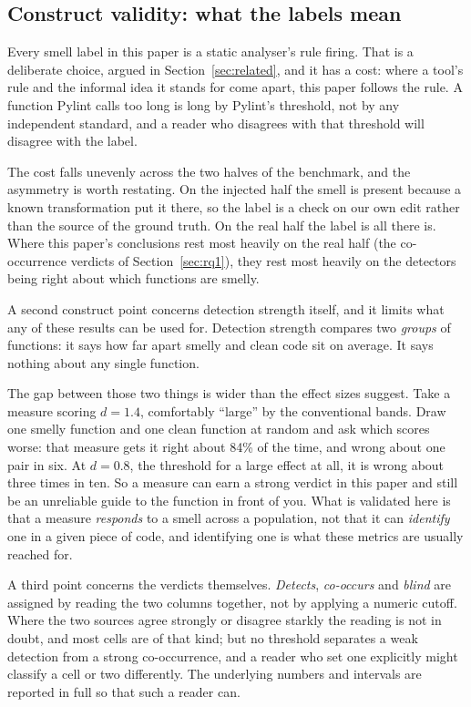 \documentclass[10pt,a4paper,twocolumn]{article}
\begin{document}
\subsection{Construct validity: what the labels mean}

Every smell label in this paper is a static analyser's rule firing. That is a
deliberate choice, argued in Section~\ref{sec:related}, and it has a cost: where a
tool's rule and the informal idea it stands for come apart, this paper follows the
rule. A function Pylint calls too long is long by Pylint's threshold, not by any
independent standard, and a reader who disagrees with that threshold will disagree
with the label.

The cost falls unevenly across the two halves of the benchmark, and the
asymmetry is worth restating. On the injected half the smell is present because
a known transformation put it there, so the label is a check on our own edit
rather than the source of the ground truth. On the real half the label is all
there is. Where this paper's conclusions rest most heavily on the real half (the
co-occurrence verdicts of Section~\ref{sec:rq1}), they rest most heavily on the
detectors being right about which functions are smelly.

A second construct point concerns detection strength itself, and it limits what
any of these results can be used for. Detection strength compares two
\emph{groups} of functions: it says how far apart smelly and clean code sit on
average. It says nothing about any single function.

The gap between those two things is wider than the effect sizes suggest. Take a
measure scoring $d = 1.4$, comfortably ``large'' by the conventional bands. Draw one
smelly function and one clean function at random and ask which scores worse:
that measure gets it right about 84\% of the time, and wrong about one pair in
six. At $d = 0.8$, the threshold for a large effect at all, it is wrong about three
times in ten. So a measure can earn a strong verdict in this paper and still be
an unreliable guide to the function in front of you. What is validated here is
that a measure \emph{responds} to a smell across a population, not that it can
\emph{identify} one in a given piece of code, and identifying one is what these
metrics are usually reached for.

A third point concerns the verdicts themselves. \emph{Detects}, \emph{co-occurs}
and \emph{blind} are assigned by reading the two columns together, not by applying
a numeric cutoff. Where the two sources agree strongly or disagree starkly the
reading is not in doubt, and most cells are of that kind; but no threshold
separates a weak detection from a strong co-occurrence, and a reader who set one
explicitly might classify a cell or two differently. The underlying numbers and
intervals are reported in full so that such a reader can.
\end{document}
